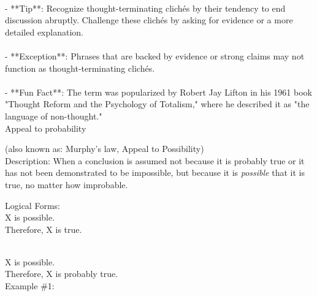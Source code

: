 \documentclass[a4paper,12pt,single,pdftex]{scrbook}
\begin{document}
    
      
    \\

    
      - **Tip**: Recognize thought-terminating clichés by their tendency to end discussion abruptly. Challenge these clichés by asking for evidence or a more detailed explanation.
    \\

    
      
    \\

    
      - **Exception**: Phrases that are backed by evidence or strong claims may not function as thought-terminating clichés.
    \\

    
      
    \\

    
      - **Fun Fact**: The term was popularized by Robert Jay Lifton in his 1961 book "Thought Reform and the Psychology of Totalism," where he described it as "the language of non-thought."
    \\

  

Appeal to probability
    
      (also known as: Murphy's law, Appeal to Possibility)
    \\

  
    Description: When a conclusion is assumed not because it is probably true or it has not been demonstrated to be impossible, but because it is {\it possible}  that it is true, no matter how improbable.

    
      Logical Forms:
    \\

    
      X is possible.
    \\

    
      Therefore, X is true.
    \\

    
       \newline

       \newline

      
    \\

    
      X is possible.
    \\

    
      Therefore, X is probably true.
    \\

    
      Example \#1:
    \\
\end{document}
